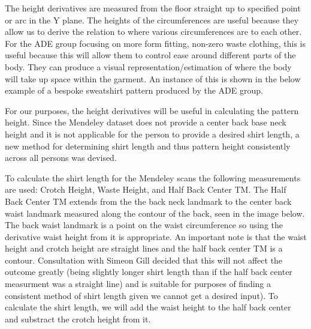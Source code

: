 The height derivatives are measured from the floor straight up to specified point or arc in the Y plane. The heights of the circumferences are useful because they allow us to derive the relation to where various circumferences are to each other. For the ADE group focusing on more form fitting, non-zero waste clothing, this is useful because this will allow them to control ease around different parts of the body. They can produce a visual representation/estimation of where the body will take up space within the garment. An instance of this is shown in the below example of a bespoke sweatshirt pattern produced by the ADE group. 

For our purposes, the height derivatives will be useful in calculating the pattern height. Since the Mendeley dataset does not provide a center back base neck height and it is not applicable for the person to provide a desired shirt length, a new method for determining shirt length and thus pattern height consistently across all persons was devised.

To calculate the shirt length for the Mendeley scans the following measurements are used: Crotch Height, Waste Height, and Half Back Center TM. The Half Back Center TM extends from the the back neck landmark to the center back waist landmark measured along the contour of the back, seen in the image below. The back waist landmark is a point on the waist circumference so using the derivative waist height from it is appropriate. An important note is that the waist height and crotch height are straight lines and the half back center TM is a contour. Consultation with Simeon Gill decided that this will not affect the outcome greatly (being slightly longer shirt length than if the half back center measurment was a straight line) and is suitable for purposes of finding a consistent method of shirt length given we cannot get a desired input).
To calculate the shirt length, we will add the waist height to the half back center and substract the crotch height from it.

